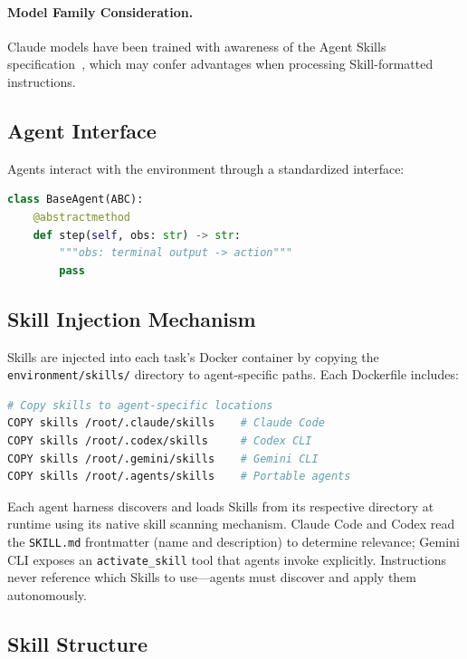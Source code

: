 \paragraph{Model Family Consideration.} Claude models have been trained with awareness of the Agent Skills specification~\citep{anthropic2025agentskills}, which may confer advantages when processing Skill-formatted instructions.

\subsection{Agent Interface}

Agents interact with the environment through a standardized interface:

\begin{lstlisting}[language=Python,basicstyle=\footnotesize\ttfamily]
class BaseAgent(ABC):
    @abstractmethod
    def step(self, obs: str) -> str:
        """obs: terminal output -> action"""
        pass
\end{lstlisting}

\subsection{Skill Injection Mechanism}
\label{app:injection}

Skills are injected into each task's Docker container by copying the \texttt{environment/skills/} directory to agent-specific paths. Each Dockerfile includes:

\begin{lstlisting}[language=bash,basicstyle=\footnotesize\ttfamily]
# Copy skills to agent-specific locations
COPY skills /root/.claude/skills    # Claude Code
COPY skills /root/.codex/skills     # Codex CLI
COPY skills /root/.gemini/skills    # Gemini CLI
COPY skills /root/.agents/skills    # Portable agents
\end{lstlisting}

Each agent harness discovers and loads Skills from its respective directory at runtime using its native skill scanning mechanism. Claude Code and Codex read the \texttt{SKILL.md} frontmatter (name and description) to determine relevance; Gemini CLI exposes an \texttt{activate\_skill} tool that agents invoke explicitly. Instructions never reference which Skills to use---agents must discover and apply them autonomously.

\subsection{Skill Structure}


